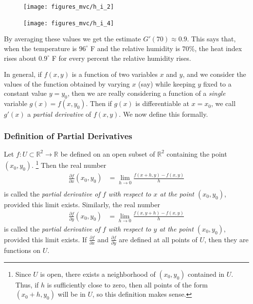 \documentclass[12pt,letterpaper,reqno]{article}
\numberwithin{equation}{section}
\newcommand{\R}{\ensuremath{\mathbb R}}
\begin{document}
{\begin{example}
\begin{figure}[h]
	\begin{center}
		\texttt{[image: figures\_mvc/h\_i\_2]}
	\end{center}
\end{figure}

\newpage

\begin{figure}[h]
	\begin{center}
		\texttt{[image: figures\_mvc/h\_i\_4]}
	\end{center}
\end{figure}
By averaging these values we get the estimate $G'(70) \approx 0.9$. This says that, when the temperature is $96^\circ$ F and the relative humidity is $70\%$, the heat index rises about $0.9^\circ$ F for every percent the relative humidity rises.
\end{example} 
In general, if $f(x,y)$ is a function of two variables $x$ and $y$, and we consider the values of the function obtained by varying $x$ (say) while keeping $y$ fixed to a constant value $y=y_0$, then we are really considering a function of a \emph{single} variable $g(x)=f(x,y_0)$. Then if $g(x)$ is differentiable at $x=x_0$, we call $g'(x)$ a \emph{partial derivative} of $f(x,y)$. We now define this formally.

\newpage 
\subsubsection{Definition of Partial Derivatives}
\begin{defn}
	Let $f:U \subset \R^2 \to \R$ be defined on an open subset of $\R^2$ containing the point $(x_0,y_0)$. \footnote{Since $U$ is open, there exists a neighborhood of $(x_0,y_0)$ contained in $U$. Thus, if $h$ is sufficiently close to zero, then all points of the form $(x_0+h,y_0)$ will be in $U$, so this definition makes sense.} Then the real number
	\begin{align*}
		\frac{\partial f}{\partial x}(x_0,y_0)&=\lim_{h \to 0}\frac{f(x+h,y)-f(x,y)}{h} \\
	\end{align*}
	is called the \emph{partial derivative of $f$ with respect to $x$ at the point $(x_0,y_0)$}, provided this limit exists. Similarly, the real number
	\begin{align*}
		\frac{\partial f}{\partial y}(x_0,y_0)&=\lim_{h \to 0}\frac{f(x,y+h)-f(x,y)}{h}
	\end{align*}
	is called the \emph{partial derivative of $f$ with respect to $y$ at the point $(x_0,y_0)$}, provided this limit exists. If $\frac{\partial f}{\partial x}$ and $\frac{\partial f}{\partial y}$ are defined at all points of $U$, then they are functions on $U$.
\end{defn}

}
\end{document}
